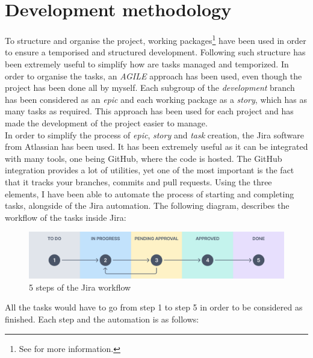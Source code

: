 \documentclass[a4paper, 12pt, oneside]{book}
\begin{document}
\section{Development methodology}
To structure and organise the project, working packages\footnote{See  for more information.} have been used in order to ensure a temporised and structured development. Following such structure has been extremely useful to simplify how are tasks managed and temporized. In order to organise the tasks, an \emph{AGILE} approach has been used, even though the project has been done all by myself. Each subgroup of the \emph{development} branch has been considered as an \emph{epic} and each working package as a \emph{story}, which has as many tasks as required. This approach has been used for each project and has made the development of the project easier to manage.
\\[8pt]
In order to simplify the process of \emph{epic}, \emph{story} and \emph{task} creation, the Jira software from Atlassian has been used. It has been extremely useful as it can be integrated with many tools, one being GitHub, where the code is hosted. The GitHub integration provides a lot of utilities, yet one of the most important is the fact that it tracks your branches, commits and pull requests. Using the three elements, I have been able to automate the process of starting and completing tasks, alongside of the Jira automation. The following diagram, describes the workflow of the tasks inside Jira:
\\
\begin{figure}[H]
	\centering
	\includegraphics[width=\textwidth]{assets/working-packages/JiraWorkflow.png}
	\caption{5 steps of the Jira workflow}
\end{figure}
All the tasks would have to go from step 1 to step 5 in order to be considered as finished. Each step and the automation is as follows:
\end{document}
